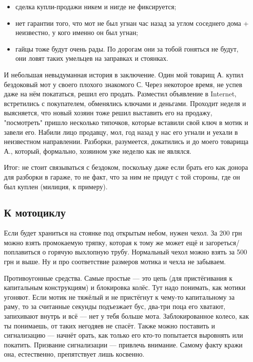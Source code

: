 \documentclass[12pt,a4paper]{article}
\begin{document}
\begin{itemize}
\item сделка купли-продажи никем и нигде не фиксируется;
\item нет гарантии того, что мот не был угнан час назад за углом
соседнего дома + неизвестно, у кого именно он был угнан;
\item гайцы тоже будут очень рады. По дорогам они за тобой гоняться
не будут, они ловят таких умельцев на заправках и стоянках.
\end{itemize}

И небольшая невыдуманная история в заключение. Один мой товарищ А. купил
бездоковый мот у своего плохого знакомого С. Через некоторое время,
не успев даже на нём покататься, решил его продать. Разместил
объявление в Internet, встретились с покупателем, обменялись ключами
и деньгами. Проходит неделя и выясняется, что новый хозяин тоже
решил выставить его на продажу, "посмотреть" пришло несколько
типочков, которые вставили свой ключ в мотик и завели его. Набили
лицо продавцу, мол, год назад у нас его угнали и уехали в неизвестном
направлении. Разборки, разумеется, докатились и до моего товарища А.,
который, формально, хозяином уже неделю как не являлся.

Итог: не стоит связываться с бездоком, поскольку даже если брать его
как донора для разборки в гараже, то не факт, что за ним не придут с той
стороны, где он был куплен (милиция, к примеру).

\subsection{К мотоциклу}

Если будет храниться на стоянке под открытым небом, нужен чехол. За
200 грн можно взять промокаемую тряпку, которая к тому же может ещё и
загореться/поплавиться о горячую выхлопную трубу. Нормальный чехол
можно взять за 500 грн и выше. Ну и про соответствие размеров мотика
и чехла не забываем.

Противоугонные средства. Самые простые --- это цепь (для пристёгивания
к капитальным конструкциям) и блокировка колёс. Тут надо понимать, как
мотики угоняют. Если мотик не тяжёлый и не пристёгнут к чему-то
капитальному за раму, то за считанные секунды подъезжает бус, два-три
поца его хватают, запихивают внутрь и всё --- нет у тебя больше мота.
Заблокированное колесо, как ты понимаешь, от таких негодяев не спасёт.
Также можно поставить и сигнализацию --- начнёт орать, как только его
кто-то попытается выровнять или покатить. Призвание сигнализации ---
привлечь внимание. Самому факту кражи она, естественно, препятствует
лишь косвенно.
\end{document}
